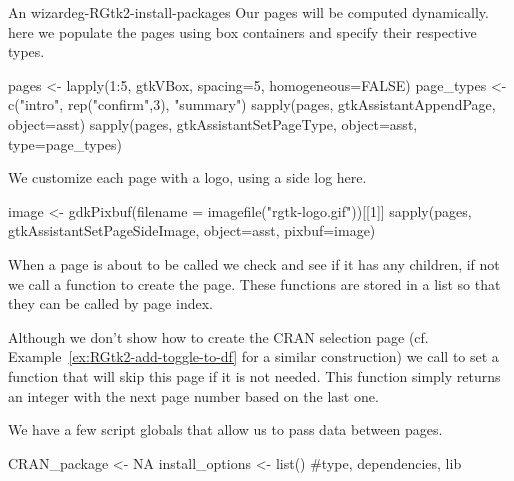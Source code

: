 \begin{example}{An  wizard}{eg-RGtk2-install-packages}
Our pages will be computed dynamically. here we populate the pages
using box containers and specify their respective types. 
\begin{Schunk}
\begin{Sinput}
 pages <- lapply(1:5, gtkVBox, spacing=5, homogeneous=FALSE)
 page_types <- c("intro", rep("confirm",3), "summary")
 sapply(pages, gtkAssistantAppendPage, object=asst)
 sapply(pages, gtkAssistantSetPageType, object=asst, 
        type=page_types)
\end{Sinput}
\end{Schunk}
%
We customize each page with a logo, using a side log here.
\begin{Schunk}
\begin{Sinput}
 image <- gdkPixbuf(filename = imagefile("rgtk-logo.gif"))[[1]]
 sapply(pages, gtkAssistantSetPageSideImage, object=asst, 
        pixbuf=image)
\end{Sinput}
\end{Schunk}

When a page is about to be called we check and see if it has any
children, if not we call a function to create the page. These
functions are stored in a list so that they can be called by page index.
\begin{Schunk}
\end{Schunk}

Although we don't show how to create the CRAN selection page
(cf. Example~\ref{ex:RGtk2-add-toggle-to-df} for a similar
construction) we call  to set
a function that will skip this page if it is not needed. This function
simply returns an integer with the next page number based on the last one.
\begin{Schunk}
\end{Schunk}

We have a few script globals that allow us to pass data between pages.
\begin{Schunk}
\begin{Sinput}
 CRAN_package <- NA
 install_options <- list() #type, dependencies, lib
\end{Sinput}
\end{Schunk}







\end{example}
